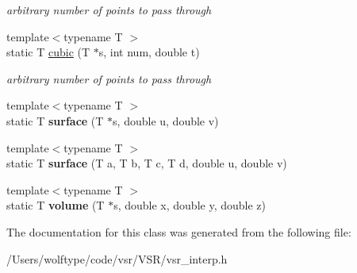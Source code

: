 \begin{DoxyCompactItemize}
\begin{DoxyCompactList}\small\item\em arbitrary number of points to pass through \end{DoxyCompactList}\item 
\hypertarget{classvsr_1_1_interp_acdf2c17dc3c3beae6b9ee7ae3003c6ae}{{\footnotesize template$<$typename T $>$ }\\static T \hyperlink{classvsr_1_1_interp_acdf2c17dc3c3beae6b9ee7ae3003c6ae}{cubic} (T $\ast$s, int num, double t)}\label{classvsr_1_1_interp_acdf2c17dc3c3beae6b9ee7ae3003c6ae}

\begin{DoxyCompactList}\small\item\em arbitrary number of points to pass through \end{DoxyCompactList}\item 
\hypertarget{classvsr_1_1_interp_aec29b20c010e04ab3351d317604f034d}{{\footnotesize template$<$typename T $>$ }\\static T {\bfseries surface} (T $\ast$s, double u, double v)}\label{classvsr_1_1_interp_aec29b20c010e04ab3351d317604f034d}

\item 
\hypertarget{classvsr_1_1_interp_aae996153ea74bdbe96f20ca5a89e94fe}{{\footnotesize template$<$typename T $>$ }\\static T {\bfseries surface} (T a, T b, T c, T d, double u, double v)}\label{classvsr_1_1_interp_aae996153ea74bdbe96f20ca5a89e94fe}

\item 
\hypertarget{classvsr_1_1_interp_ae2752babd4ac6cd9c847d2e1821328aa}{{\footnotesize template$<$typename T $>$ }\\static T {\bfseries volume} (T $\ast$s, double x, double y, double z)}\label{classvsr_1_1_interp_ae2752babd4ac6cd9c847d2e1821328aa}

\end{DoxyCompactItemize}


The documentation for this class was generated from the following file\-:\begin{DoxyCompactItemize}
\item 
/\-Users/wolftype/code/vsr/\-V\-S\-R/vsr\-\_\-interp.\-h\end{DoxyCompactItemize}
